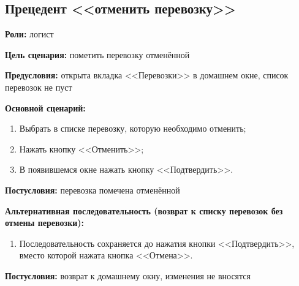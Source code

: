 \subsection{Прецедент <<отменить перевозку>>}
\textbf{Роли:} логист \par
\textbf{Цель сценария:} пометить перевозку отменённой \par
\textbf{Предусловия:} открыта вкладка <<Перевозки>> в домашнем окне, 
     список перевозок не пуст \par
\textbf{Основной сценарий:} 
\begin{enumerate}
    \item Выбрать в списке перевозку, которую необходимо отменить;
    \item Нажать кнопку <<Отменить>>;
    \item В появившемся окне нажать кнопку <<Подтвердить>>.
\end{enumerate} \par
\textbf{Постусловия:} перевозка помечена отменённой \par
\textbf{Альтернативная последовательность 
    (возврат к списку перевозок без отмены перевозки):} \par
\begin{enumerate}
    \item Последовательность сохраняется до нажатия кнопки <<Подтвердить>>, 
        вместо которой нажата кнопка <<Отмена>>.
\end{enumerate} \par
\textbf{Постусловия:} возврат к домашнему окну, изменения не вносятся \par

